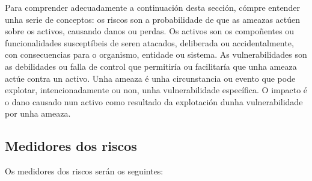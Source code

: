 Para comprender adecuadamente a continuación desta sección, cómpre entender unha serie de conceptos: os riscos son a probabilidade de que as ameazas actúen sobre os activos, causando danos ou perdas. Os activos son os compoñentes ou funcionalidades susceptíbeis de seren atacados, deliberada ou accidentalmente, con consecuencias para o organismo, entidade ou sistema. As vulnerabilidades son as debilidades ou falla de control que permitiría ou facilitaría que unha ameaza actúe contra un activo. Unha ameaza é unha circunstancia ou evento que pode explotar, intencionadamente ou non, unha vulnerabilidade específica. O impacto é o dano causado nun activo como resultado da explotación dunha vulnerabilidade por unha ameaza.

\subsection{Medidores dos riscos}

Os medidores dos riscos serán os seguintes:

